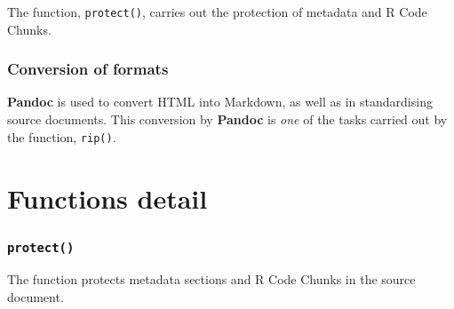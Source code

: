 \documentclass[a4paper, 12pt]{report}
\begin{document}
The function, \texttt{protect()}, carries out the protection of metadata and R Code Chunks.



%
%
%
%

\subsubsection*{Conversion of formats}
\textbf{Pandoc} is used to convert HTML into Markdown, as well as in standardising source documents. This conversion by \textbf{Pandoc} is \emph{one} of the tasks carried out by the function, \texttt{rip()}.



\newpage
\section{Functions detail}
\subsubsection*{\texttt{protect()}}
The function protects metadata sections and R Code Chunks in the source document.
\end{document}
